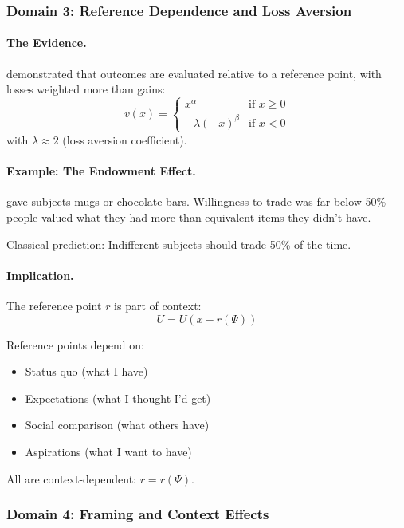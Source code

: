 \subsubsection{Domain 3: Reference Dependence and Loss Aversion}

\paragraph{The Evidence.}
\citet{kahnemantversky1979} demonstrated that outcomes are evaluated
relative to a reference point, with losses weighted more than gains:
\begin{equation}
  v(x) = \begin{cases}
    x^\alpha & \text{if } x \geq 0 \\
    -\lambda (-x)^\beta & \text{if } x < 0
  \end{cases}
\end{equation}
with $\lambda \approx 2$ (loss aversion coefficient).

\paragraph{Example: The Endowment Effect.}
\citet{knetschetal1990} gave subjects mugs or chocolate bars.
Willingness to trade was far below 50\%---people valued what they had
more than equivalent items they didn't have.

Classical prediction: Indifferent subjects should trade 50\% of the time.

\paragraph{Implication.}
The reference point $r$ is part of context:
\begin{equation}
  U = U(x - r(\Psi))
\end{equation}

Reference points depend on:
\begin{itemize}
  \item Status quo (what I have)
  \item Expectations (what I thought I'd get) \citep{koszegirab2006}
  \item Social comparison (what others have)
  \item Aspirations (what I want to have)
\end{itemize}

All are context-dependent: $r = r(\Psi)$.

\subsubsection{Domain 4: Framing and Context Effects}

